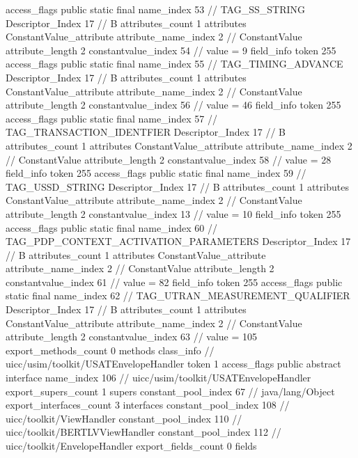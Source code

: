 {{{{{				access_flags	public static final
				name_index	53		// TAG_SS_STRING
				Descriptor_Index	17		// B
				attributes_count	1
				attributes {
				ConstantValue_attribute {
					attribute_name_index	2		// ConstantValue
					attribute_length	2
					constantvalue_index	54		// value = 9
				}
				}
			}
			field_info {
				token	255
				access_flags	public static final
				name_index	55		// TAG_TIMING_ADVANCE
				Descriptor_Index	17		// B
				attributes_count	1
				attributes {
				ConstantValue_attribute {
					attribute_name_index	2		// ConstantValue
					attribute_length	2
					constantvalue_index	56		// value = 46
				}
				}
			}
			field_info {
				token	255
				access_flags	public static final
				name_index	57		// TAG_TRANSACTION_IDENTFIER
				Descriptor_Index	17		// B
				attributes_count	1
				attributes {
				ConstantValue_attribute {
					attribute_name_index	2		// ConstantValue
					attribute_length	2
					constantvalue_index	58		// value = 28
				}
				}
			}
			field_info {
				token	255
				access_flags	public static final
				name_index	59		// TAG_USSD_STRING
				Descriptor_Index	17		// B
				attributes_count	1
				attributes {
				ConstantValue_attribute {
					attribute_name_index	2		// ConstantValue
					attribute_length	2
					constantvalue_index	13		// value = 10
				}
				}
			}
			field_info {
				token	255
				access_flags	public static final
				name_index	60		// TAG_PDP_CONTEXT_ACTIVATION_PARAMETERS
				Descriptor_Index	17		// B
				attributes_count	1
				attributes {
				ConstantValue_attribute {
					attribute_name_index	2		// ConstantValue
					attribute_length	2
					constantvalue_index	61		// value = 82
				}
				}
			}
			field_info {
				token	255
				access_flags	public static final
				name_index	62		// TAG_UTRAN_MEASUREMENT_QUALIFIER
				Descriptor_Index	17		// B
				attributes_count	1
				attributes {
				ConstantValue_attribute {
					attribute_name_index	2		// ConstantValue
					attribute_length	2
					constantvalue_index	63		// value = 105
				}
				}
			}
			}
			export_methods_count	0
			methods {
			}
		}
		class_info {		// uicc/usim/toolkit/USATEnvelopeHandler
			token	1
			access_flags	public abstract interface
			name_index	106		// uicc/usim/toolkit/USATEnvelopeHandler
			export_supers_count	1
			supers {
				constant_pool_index	67		// java/lang/Object
			}
			export_interfaces_count	3
			interfaces {
				constant_pool_index	108		// uicc/toolkit/ViewHandler
				constant_pool_index	110		// uicc/toolkit/BERTLVViewHandler
				constant_pool_index	112		// uicc/toolkit/EnvelopeHandler
			}
			export_fields_count	0
			fields {
}}}}
